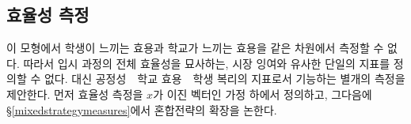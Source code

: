 \documentclass[12pt]{article} %
\newif\ifEN
\newtheorem{theorem}{Theorem}
\theoremstyle{definition}
\newtheorem{theorem}{정리}
\theoremstyle{definition}
\begin{document}
 \fi

\ifEN \subsection{Measures of efficiency} \else \subsection{효율성 측정} \fi
\ifEN{
In our model, the level of utility experienced by the students is incommensurate with the utility experienced by the schools. Thus, there is no single index akin to market surplus that can capture the overall efficiency of the admissions process. Instead, we propose separate measures which serve as indices of fairness, school utility, and student welfare. We will first define these measures under the assumption that $x$ is a binary vector, then discuss the extension to mixed strategies in \S\ref{mixedstrategymeasures}.
} \else {
이 모형에서 학생이 느끼는 효용과 학교가 느끼는 효용을 같은 차원에서 측정할 수 없다. 따라서 입시 과정의 전체 효율성을 묘사하는, 시장 잉여와 유사한 단일의 지표를 정의할 수 없다. 대신 공정성~\textbullet~학교 효용~\textbullet~학생 복리의 지표로서 기능하는 별개의 측정을 제안한다. 먼저 효율성 측정을 $x$가 이진 벡터인 가정 하에서 정의하고, 그다음에 \S\ref{mixedstrategymeasures}에서 혼합전략의 확장을 논한다.
} \fi
\end{document}
